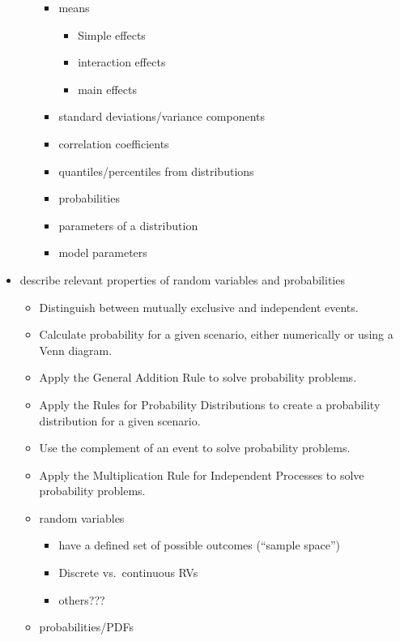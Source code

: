 \documentclass[
]{book}
\providecommand{\tightlist}{%
  \setlength{\itemsep}{0pt}\setlength{\parskip}{0pt}}
\theoremstyle{definition}
\theoremstyle{definition}
\theoremstyle{definition}
\theoremstyle{remark}
\begin{document}
\begin{itemize}
\begin{itemize}
    \begin{itemize}
    \tightlist
    \item
      means

      \begin{itemize}
      \tightlist
      \item
        Simple effects
      \item
        interaction effects
      \item
        main effects
      \end{itemize}
    \item
      standard deviations/variance components
    \item
      correlation coefficients
    \item
      quantiles/percentiles from distributions
    \item
      probabilities
    \item
      parameters of a distribution
    \item
      model parameters
    \end{itemize}
  \end{itemize}
\item
  describe relevant properties of random variables and probabilities

  \begin{itemize}
  \tightlist
  \item
    Distinguish between mutually exclusive and independent events.
  \item
    Calculate probability for a given scenario, either numerically or using a Venn diagram.
  \item
    Apply the General Addition Rule to solve probability problems.
  \item
    Apply the Rules for Probability Distributions to create a probability distribution for a given scenario.
  \item
    Use the complement of an event to solve probability problems.
  \item
    Apply the Multiplication Rule for Independent Processes to solve probability problems.
  \item
    random variables

    \begin{itemize}
    \tightlist
    \item
      have a defined set of possible outcomes (``sample space'')
    \item
      Discrete vs.~continuous RVs
    \item
      others???
    \end{itemize}
  \item
    probabilities/PDFs


\end{itemize}
\end{itemize}
\end{document}
